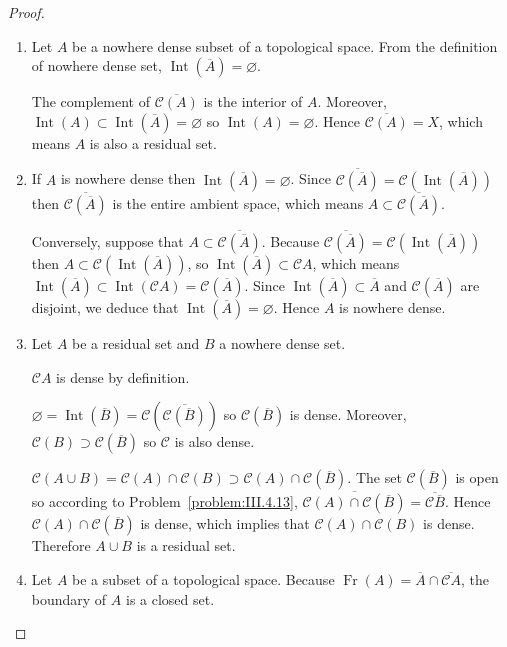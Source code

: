 \begin{proof}
	\begin{enumerate}[label={(\arabic*)},itemsep=0pt,leftmargin=*]
		\item Let \(A\) be a nowhere dense subset of a topological space. From the definition of nowhere dense set, \( \operatorname{Int}(\overline{A}) = \varnothing \).

		      The complement of \( \overline{\mathscr{C}(A)} \) is the interior of \(A\). Moreover, \( \operatorname{Int}(A) \subset \operatorname{Int}(\overline{A}) = \varnothing \) so \( \operatorname{Int}(A) = \varnothing \). Hence \( \overline{\mathscr{C}(A)} = X \), which means \(A\) is also a residual set.
		\item If \(A\) is nowhere dense then \( \operatorname{Int}(\overline{A}) = \varnothing \). Since \( \overline{\mathscr{C}(\overline{A})} = \mathscr{C}(\operatorname{Int}(\overline{A})) \) then \( \overline{\mathscr{C}(\overline{A})} \) is the entire ambient space, which means \( A \subset \overline{\mathscr{C}(\overline{A})} \).

		      Conversely, suppose that \( A \subset \overline{\mathscr{C}(\overline{A})} \). Because \( \overline{\mathscr{C}(\overline{A})} = \mathscr{C}(\operatorname{Int}(\overline{A})) \) then \( A \subset \mathscr{C}(\operatorname{Int}(\overline{A})) \), so \( \operatorname{Int}(\overline{A}) \subset \mathscr{C}A \), which means \( \operatorname{Int}(\overline{A}) \subset \operatorname{Int}(\mathscr{C}A) = \mathscr{C}(\overline{A}) \). Since \( \operatorname{Int}(\overline{A}) \subset \overline{A} \) and \( \mathscr{C}(\overline{A}) \) are disjoint, we deduce that \( \operatorname{Int}(\overline{A}) = \varnothing \). Hence \(A\) is nowhere dense.
		\item Let \(A\) be a residual set and \(B\) a nowhere dense set.

		      \( \mathscr{C}A \) is dense by definition.

		      \( \varnothing = \operatorname{Int}(\overline{B}) = \mathscr{C}(\overline{\mathscr{C}(\overline{B})}) \) so \( \mathscr{C}(\overline{B}) \) is dense. Moreover, \( \mathscr{C}(B) \supset \mathscr{C}(\overline{B}) \) so \( \mathscr{C} \) is also dense.

		      \( \mathscr{C}(A \cup B) = \mathscr{C}(A) \cap \mathscr{C}(B) \supset \mathscr{C}(A) \cap \mathscr{C}(\overline{B}) \). The set \( \mathscr{C}(\overline{B}) \) is open so according to Problem~\ref{problem:III.4.13}, \( \overline{\mathscr{C}(A) \cap \mathscr{C}(\overline{B})} = \overline{\mathscr{C}\overline{B}} \). Hence \(\mathscr{C}(A) \cap \mathscr{C}(\overline{B})\) is dense, which implies that \(\mathscr{C}(A) \cap \mathscr{C}(B)\) is dense. Therefore \(A \cup B\) is a residual set.
		\item Let \(A\) be a subset of a topological space. Because \( \operatorname{Fr}(A) = \overline{A} \cap \overline{\mathscr{C}A} \), the boundary of \(A\) is a closed set.


\end{enumerate}
\end{proof}
